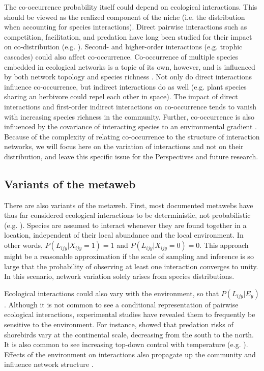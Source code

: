 \documentclass[12pt]{article}
\begin{document}
The co-occurrence probability itself could depend on ecological interactions.
This should be viewed as the realized component of the niche (i.e. the
distribution when accounting for species interactions). Direct pairwise
interactions such as competition, facilitation, and predation have long been
studied for their impact on co-distribution (e.g. \citealt{Diamond1976, Connor1980,
Gotelli2000}). Second- and higher-order interactions (e.g. trophic cascades)
could also affect co-occurrence. Co-occurrence of multiple species embedded in
ecological networks is a topic of its own, however, and is influenced by both network
topology and species richness \citep{Cazelles2016}. Not only do direct interactions
influence co-occurrence, but indirect interactions do as well (e.g. plant species
sharing an herbivore could repel each other in space). The impact of direct
interactions and first-order indirect interactions on co-occurrence tends to
vanish with increasing species richness in the community. Further, co-occurrence
is also influenced by the covariance of interacting species to an
environmental gradient \citep{Cazelles2015}. Because of the complexity of relating
co-occurrence to the structure of interaction networks, we will focus here on
the variation of interactions and not on their distribution, and leave this
specific issue for the Perspectives and future research.

\subsection*{Variants of the metaweb}

There are also variants of the metaweb. First, most documented metawebs have
thus far considered ecological interactions to be deterministic, not
probabilistic (e.g. \citealt{Havens1992, Wood2015}). Species are assumed to
interact whenever they are found together in a location, independent of their
local abundance and the local environment. In other words,
$P(L_{ijy}|X_{ijy}=1) = 1$ and $P(L_{ijy}|X_{ijy}=0) = 0$. This approach might
be a reasonable approximation if the scale of sampling and inference is so
large that the probability of observing at least one interaction converges to
unity. In this scenario, network variation solely arises from species
distributions.

Ecological interactions could also vary with the environment, so that $P(L_{ijy}
|E_y)$. Although it is not common to see a conditional representation of
pairwise ecological interactions, experimental studies have revealed them to
frequently be sensitive to the environment. For instance, \citep{Mckinnon2010} showed
that predation risks of shorebirds vary at the continental scale, decreasing
from the south to the north. It is also common to see increasing top-down
control with temperature (e.g. \citealt{Shurin2012, Gray2016}). Effects of the
environment on interactions also propagate up the community and influence network
structure \citep{Tylianakis2007, Woodward2010; Petchey2010; Lelong2015}.
\end{document}
